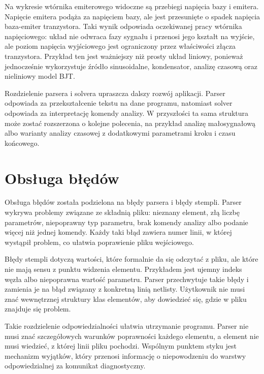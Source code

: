 Na wykresie wtórnika emiterowego widoczne są przebiegi napięcia bazy i emitera. Napięcie emitera podąża za napięciem bazy, ale jest przesunięte o spadek napięcia baza-emiter tranzystora. Taki wynik odpowiada oczekiwanej pracy wtórnika napięciowego: układ nie odwraca fazy sygnału i przenosi jego kształt na wyjście, ale poziom napięcia wyjściowego jest ograniczony przez właściwości złącza tranzystora. Przykład ten jest ważniejszy niż prosty układ liniowy, ponieważ jednocześnie wykorzystuje źródło sinusoidalne, kondensator, analizę czasową oraz nieliniowy model BJT.

Rozdzielenie parsera i solvera upraszcza dalszy rozwój aplikacji. Parser odpowiada za przekształcenie tekstu na dane programu, natomiast solver odpowiada za interpretację komendy analizy. W przyszłości ta sama struktura może zostać rozszerzona o kolejne polecenia, na przykład analizę małosygnałową albo warianty analizy czasowej z dodatkowymi parametrami kroku i czasu końcowego.

\section{Obsługa błędów}
\label{sec:obsluga-bledow}

Obsługa błędów została podzielona na błędy parsera i błędy stempli. Parser wykrywa problemy związane ze składnią pliku: nieznany element, złą liczbę parametrów, niepoprawny typ parametru, brak komendy analizy albo podanie więcej niż jednej komendy. Każdy taki błąd zawiera numer linii, w której wystąpił problem, co ułatwia poprawienie pliku wejściowego.

Błędy stempli dotyczą wartości, które formalnie da się odczytać z pliku, ale które nie mają sensu z punktu widzenia elementu. Przykładem jest ujemny indeks węzła albo niepoprawna wartość parametru. Parser przechwytuje takie błędy i zamienia je na błąd związany z konkretną linią netlisty. Użytkownik nie musi znać wewnętrznej struktury klas elementów, aby dowiedzieć się, gdzie w pliku znajduje się problem.

Takie rozdzielenie odpowiedzialności ułatwia utrzymanie programu. Parser nie musi znać szczegółowych warunków poprawności każdego elementu, a element nie musi wiedzieć, z której linii pliku pochodzi. Wspólnym punktem styku jest mechanizm wyjątków, który przenosi informację o niepowodzeniu do warstwy odpowiedzialnej za komunikat diagnostyczny.
